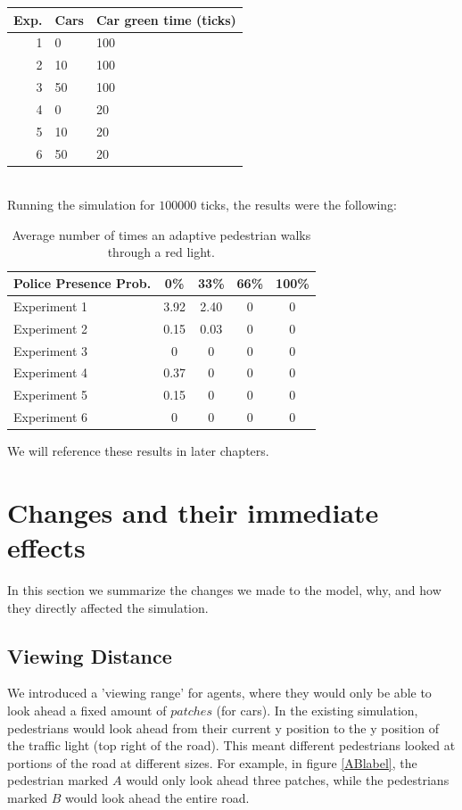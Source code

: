 \documentclass[a4paper]{article}
\begin{document}
\begin{tabular}{ r | l | l }
  Exp. & Cars & Car green time (ticks) \\
  \hline
  1 &  0 & 100 \\
  2 & 10 & 100 \\
  3 & 50 & 100 \\
  4 &  0 & 20  \\
  5 & 10 & 20  \\
  6 & 50 & 20  \\
\end{tabular}\\

Running the simulation for $100 000$ ticks, the results were the following:
\begin{table}[H]
\centering
\begin{tabular}{ l | c c c c }
  Police Presence Prob. & 0\% & 33\% & 66\% & 100\% \\ 
  \hline
  Experiment 1 & 3.92 & 2.40 & 0 & 0  \\
  Experiment 2 & 0.15 & 0.03 & 0 & 0  \\
  Experiment 3 & 0    & 0    & 0 & 0  \\
  Experiment 4 & 0.37 & 0    & 0 & 0  \\
  Experiment 5 & 0.15 & 0    & 0 & 0  \\
  Experiment 6 & 0    & 0    & 0 & 0  \\
\end{tabular}
\caption{Average number of times an adaptive 
pedestrian walks through a red light.}
\end{table}

We will reference these results in later chapters.

\clearpage

\section{Changes and their immediate effects}
In this section we summarize the changes we made to the model, why, and how they directly affected the simulation.

\subsection{Viewing Distance}
We introduced a 'viewing range' for agents, where they would only be able to look ahead a fixed amount of $patches$ (for cars). In the existing simulation, pedestrians would look ahead from their current y position to the y position of the traffic light (top right of the road). This meant different pedestrians looked at portions of the road at different sizes. For example, in figure \ref{ABlabel}, the pedestrian marked $A$ would only look ahead three patches, while the pedestrians marked $B$ would look ahead the entire road.
\end{document}
